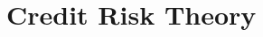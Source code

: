 \documentclass[main.tex]{subfiles}
\begin{document}
    \part{Credit Risk Theory}
    \label{sec:credit-risk-theory}

    
    
    
    
    
\end{document}
